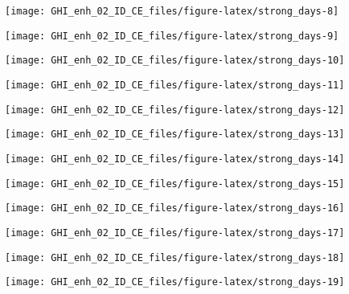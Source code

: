 \documentclass[
  10pt,
  a4paper,oneside]{article}
\begin{document}
\begin{center}\texttt{[image: GHI\_enh\_02\_ID\_CE\_files/figure-latex/strong\_days-8]} \end{center}

\begin{center}\texttt{[image: GHI\_enh\_02\_ID\_CE\_files/figure-latex/strong\_days-9]} \end{center}

\begin{center}\texttt{[image: GHI\_enh\_02\_ID\_CE\_files/figure-latex/strong\_days-10]} \end{center}

\begin{center}\texttt{[image: GHI\_enh\_02\_ID\_CE\_files/figure-latex/strong\_days-11]} \end{center}

\begin{center}\texttt{[image: GHI\_enh\_02\_ID\_CE\_files/figure-latex/strong\_days-12]} \end{center}

\begin{center}\texttt{[image: GHI\_enh\_02\_ID\_CE\_files/figure-latex/strong\_days-13]} \end{center}

\begin{center}\texttt{[image: GHI\_enh\_02\_ID\_CE\_files/figure-latex/strong\_days-14]} \end{center}

\begin{center}\texttt{[image: GHI\_enh\_02\_ID\_CE\_files/figure-latex/strong\_days-15]} \end{center}

\begin{center}\texttt{[image: GHI\_enh\_02\_ID\_CE\_files/figure-latex/strong\_days-16]} \end{center}

\begin{center}\texttt{[image: GHI\_enh\_02\_ID\_CE\_files/figure-latex/strong\_days-17]} \end{center}

\begin{center}\texttt{[image: GHI\_enh\_02\_ID\_CE\_files/figure-latex/strong\_days-18]} \end{center}

\begin{center}\texttt{[image: GHI\_enh\_02\_ID\_CE\_files/figure-latex/strong\_days-19]} \end{center}
\end{document}
